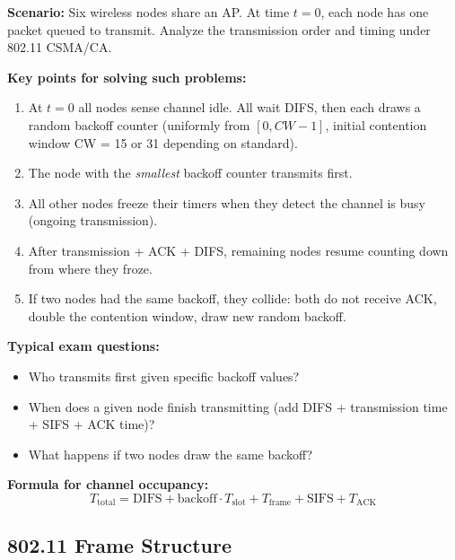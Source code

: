 \begin{exambox}
\textbf{Scenario:} Six wireless nodes share an AP. At time $t=0$, each node has one packet queued to transmit. Analyze the transmission order and timing under 802.11 CSMA/CA.

\medskip
\textbf{Key points for solving such problems:}
\begin{enumerate}[noitemsep]
    \item At $t=0$ all nodes sense channel idle. All wait DIFS, then each draws a random backoff counter (uniformly from $[0, CW-1]$, initial contention window CW = 15 or 31 depending on standard).
    \item The node with the \emph{smallest} backoff counter transmits first.
    \item All other nodes freeze their timers when they detect the channel is busy (ongoing transmission).
    \item After transmission + ACK + DIFS, remaining nodes resume counting down from where they froze.
    \item If two nodes had the same backoff, they collide: both do not receive ACK, double the contention window, draw new random backoff.
\end{enumerate}

\medskip
\textbf{Typical exam questions:}
\begin{itemize}[noitemsep]
    \item Who transmits first given specific backoff values?
    \item When does a given node finish transmitting (add DIFS + transmission time + SIFS + ACK time)?
    \item What happens if two nodes draw the same backoff?
\end{itemize}

\medskip
\textbf{Formula for channel occupancy:}
\[ T_\text{total} = \text{DIFS} + \text{backoff} \cdot T_\text{slot} + T_\text{frame} + \text{SIFS} + T_\text{ACK} \]
\end{exambox}

\subsection{802.11 Frame Structure}

